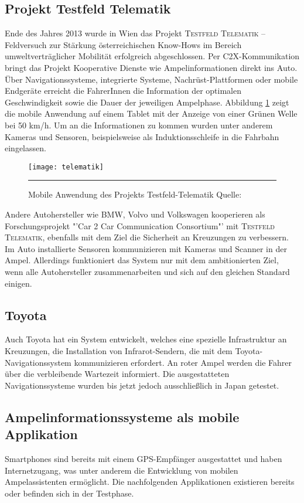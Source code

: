 \subsection*{Projekt Testfeld Telematik}
Ende des Jahres 2013 wurde in Wien das Projekt \textsc{Testfeld Telematik} -- Feldversuch zur Stärkung österreichischen Know-Hows im Bereich umweltverträglicher Mobilität erfolgreich abgeschlossen. Per \gls{C2X}-Kommunikation bringt das Projekt Kooperative Dienste wie Ampelinformationen direkt ins Auto. Über Navigationssysteme, integrierte Systeme, Nachrüst-Plattformen oder mobile Endgeräte erreicht die FahrerInnen die Information der optimalen Geschwindigkeit sowie die Dauer der jeweiligen Ampelphase\cite{Telematik}. Abbildung \ref{fig:telematik} zeigt die mobile Anwendung auf einem Tablet mit der Anzeige von einer Grünen Welle bei 50 km/h. Um an die Informationen zu kommen wurden unter anderem Kameras und Sensoren, beispielsweise als Induktionsschleife in die Fahrbahn eingelassen. 
\begin{figure}[H]
    \centering
    \texttt{[image: telematik]} 
    \rule{35em}{0.5pt}    
    \caption[Projekt Testfeld-Telematik Ampelinformation]{Mobile Anwendung des Projekts Testfeld-Telematik Quelle: \cite{Telematik}}
    \label{fig:telematik}
\end{figure} 
Andere Autohersteller wie BMW, Volvo und Volkswagen kooperieren als Forschungsprojekt "'Car 2 Car Communication Consortium"' mit \textsc{Testfeld Telematik}, ebenfalls mit dem Ziel die Sicherheit an Kreuzungen zu verbessern. Im Auto installierte Sensoren kommunizieren mit Kameras und Scanner in der Ampel. Allerdings funktioniert das System nur mit dem ambitionierten Ziel, wenn alle Autohersteller zusammenarbeiten und sich auf den gleichen Standard einigen. \cite{Siemens}
\subsection*{Toyota}
Auch Toyota hat ein System entwickelt, welches eine spezielle Infrastruktur an Kreuzungen, die Installation von Infrarot-Sendern, die mit dem Toyota-Navigationssystem kommunizieren erfordert. An roter Ampel werden die Fahrer über die verbleibende Wartezeit informiert. Die ausgestatteten Navigationssysteme wurden bis jetzt jedoch ausschließlich in Japan getestet. \cite{Toyota}
%
%
\subsection{Ampelinformationssysteme als mobile Applikation}
\glspl{Smartphone} sind bereits mit einem \gls{GPS}-Empfänger ausgestattet und haben Internetzugang, was unter anderem die Entwicklung von mobilen Ampelassistenten ermöglicht. Die nachfolgenden Applikationen existieren bereits oder befinden sich in der Testphase.
